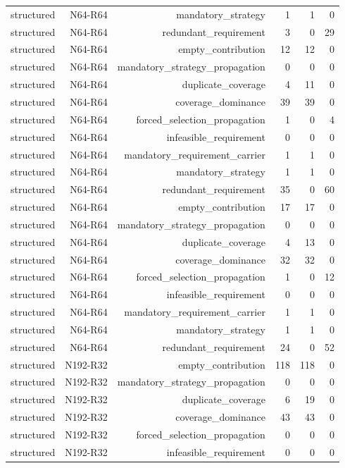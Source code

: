 {\begin{longtable}{lrrrrr}
structured & N64-R64 & mandatory\_strategy & 1 & 1 & 0 \\
structured & N64-R64 & redundant\_requirement & 3 & 0 & 29 \\
structured & N64-R64 & empty\_contribution & 12 & 12 & 0 \\
structured & N64-R64 & mandatory\_strategy\_propagation & 0 & 0 & 0 \\
structured & N64-R64 & duplicate\_coverage & 4 & 11 & 0 \\
structured & N64-R64 & coverage\_dominance & 39 & 39 & 0 \\
structured & N64-R64 & forced\_selection\_propagation & 1 & 0 & 4 \\
structured & N64-R64 & infeasible\_requirement & 0 & 0 & 0 \\
structured & N64-R64 & mandatory\_requirement\_carrier & 1 & 1 & 0 \\
structured & N64-R64 & mandatory\_strategy & 1 & 1 & 0 \\
structured & N64-R64 & redundant\_requirement & 35 & 0 & 60 \\
structured & N64-R64 & empty\_contribution & 17 & 17 & 0 \\
structured & N64-R64 & mandatory\_strategy\_propagation & 0 & 0 & 0 \\
structured & N64-R64 & duplicate\_coverage & 4 & 13 & 0 \\
structured & N64-R64 & coverage\_dominance & 32 & 32 & 0 \\
structured & N64-R64 & forced\_selection\_propagation & 1 & 0 & 12 \\
structured & N64-R64 & infeasible\_requirement & 0 & 0 & 0 \\
structured & N64-R64 & mandatory\_requirement\_carrier & 1 & 1 & 0 \\
structured & N64-R64 & mandatory\_strategy & 1 & 1 & 0 \\
structured & N64-R64 & redundant\_requirement & 24 & 0 & 52 \\
structured & N192-R32 & empty\_contribution & 118 & 118 & 0 \\
structured & N192-R32 & mandatory\_strategy\_propagation & 0 & 0 & 0 \\
structured & N192-R32 & duplicate\_coverage & 6 & 19 & 0 \\
structured & N192-R32 & coverage\_dominance & 43 & 43 & 0 \\
structured & N192-R32 & forced\_selection\_propagation & 0 & 0 & 0 \\
structured & N192-R32 & infeasible\_requirement & 0 & 0 & 0 \\

\end{longtable}}
